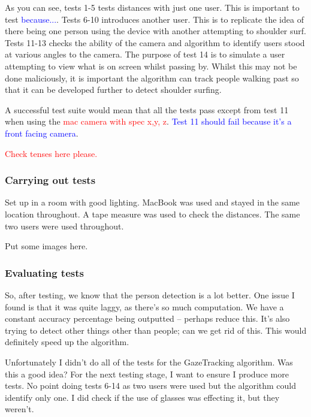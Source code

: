 \documentclass[12pt]{article}
\theoremstyle{plain}
\theoremstyle{definition}
\begin{document}
As you can see, tests 1-5 tests distances with just one user. This is important to test \textcolor{blue}{because...}.
Tests 6-10 introduces another user. This is to replicate the idea of there being one person using the device with another attempting to shoulder surf.
Tests 11-13 checks the ability of the camera and algorithm to identify users stood at various angles to the camera.
The purpose of test 14 is to simulate a user attempting to view what is on screen whilst passing by. Whilst this may not be done maliciously, it is important the algorithm can track people walking past so that it can be developed further to detect shoulder surfing.

A successful test suite would mean that all the tests pass except from test 11 when using the \textcolor{red}{mac camera with spec x,y, z}. \textcolor{blue}{Test 11 should fail because it's a front facing camera}.

\textcolor{red}{Check tenses here please.}

\subsubsection{Carrying out tests}

Set up in a room with good lighting. MacBook was used and stayed in the same location throughout. A tape measure was used to check the distances. The same two users were used throughout.

Put some images here. 

\subsubsection{Evaluating tests}

So, after testing, we know that the person detection is a lot better. One issue I found is that it was quite laggy, as there's so much computation. We have a constant accuracy percentage being outputted – perhaps reduce this. It’s also trying to detect other things other than people; can we get rid of this. This would definitely speed up the algorithm.

Unfortunately I didn't do all of the tests for the GazeTracking algorithm. Was this a good idea? For the next testing stage, I want to ensure I produce more tests. No point doing tests 6-14 as two users were used but the algorithm could identify only one. I did check if the use of glasses was effecting it, but they weren't.
\end{document}
